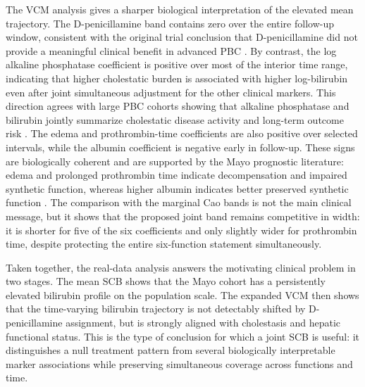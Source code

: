 The VCM analysis gives a sharper biological interpretation of the elevated
mean trajectory. The D-penicillamine band contains zero over the entire
follow-up window, consistent with the original trial conclusion that
D-penicillamine did not provide a meaningful clinical benefit in advanced PBC
\citep{Dickson1985,Lindor2009,Lindor2019}. By contrast, the log alkaline
phosphatase coefficient is positive over most of the interior time range,
indicating that higher cholestatic burden is associated with higher
log-bilirubin even after joint simultaneous adjustment for the other clinical
markers. This direction agrees with large PBC cohorts showing that alkaline
phosphatase and bilirubin jointly summarize cholestatic disease activity and
long-term outcome risk \citep{Lammers2014,Carbone2016}. The edema and
prothrombin-time coefficients are also positive over selected intervals, while
the albumin coefficient is negative early in follow-up. These signs are
biologically coherent and are supported by the Mayo prognostic literature:
edema and prolonged prothrombin time indicate decompensation and impaired
synthetic function, whereas higher albumin indicates better preserved synthetic
function \citep{Dickson1989,Murtaugh1994,KaplanGershwin2005}. The
comparison with the marginal Cao bands is not the main clinical message, but it
shows that the proposed joint band remains competitive in width: it is shorter
for five of the six coefficients and only slightly wider for prothrombin time,
despite protecting the entire six-function statement simultaneously.

Taken together, the real-data analysis answers the motivating clinical problem
in two stages. The mean SCB shows that the Mayo cohort has a persistently
elevated bilirubin profile on the population scale. The expanded VCM then
shows that the time-varying bilirubin trajectory is not detectably shifted by
D-penicillamine assignment, but is strongly aligned with cholestasis and
hepatic functional status. This is the type of conclusion for which a joint
SCB is useful: it distinguishes a null treatment pattern from several
biologically interpretable marker associations while preserving simultaneous
coverage across functions and time.
